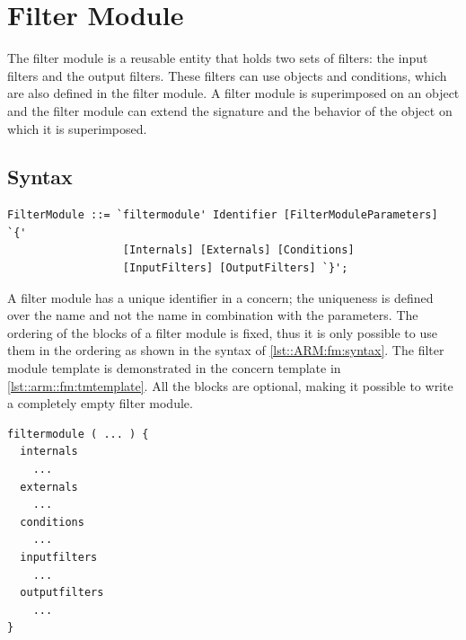 \chapter{Filter Module} \label{chapter:filtermodule}
The filter module is a reusable entity that holds two sets of filters: the input filters and the output filters. 
These filters can use objects and conditions, which are also defined in the filter module. 
A filter module is superimposed on an object and the filter module can extend the signature and the behavior of the object on which it is superimposed.

\section{Syntax}
\begin{lstlisting}[caption = {Filter module syntax}, label = lst::ARM:fm:syntax, style = listing, language = ebnf, float = tpb]
FilterModule ::= `filtermodule' Identifier [FilterModuleParameters] `{'
                  [Internals] [Externals] [Conditions]
                  [InputFilters] [OutputFilters] `}';
\end{lstlisting}
A filter module has a unique identifier in a concern; the uniqueness is defined over the name and not the name in combination with the parameters.
The  ordering of the blocks of a filter module is fixed, thus it is only possible to use them in the ordering as shown in the syntax of \autoref{lst::ARM:fm:syntax}. 
The filter module template is demonstrated in the concern template in \autoref{lst::arm::fm:tmtemplate}.
All the blocks are optional, making it possible to write a completely empty filter module.
\begin{lstlisting}[language={Composestar},style=floatlisting, caption={Filter module template},label={lst::arm::fm:tmtemplate}, floatplacement=tbp]
filtermodule ( ... ) {
  internals
    ...
  externals
    ...
  conditions
    ...
  inputfilters
    ...
  outputfilters
    ...
}
\end{lstlisting}

